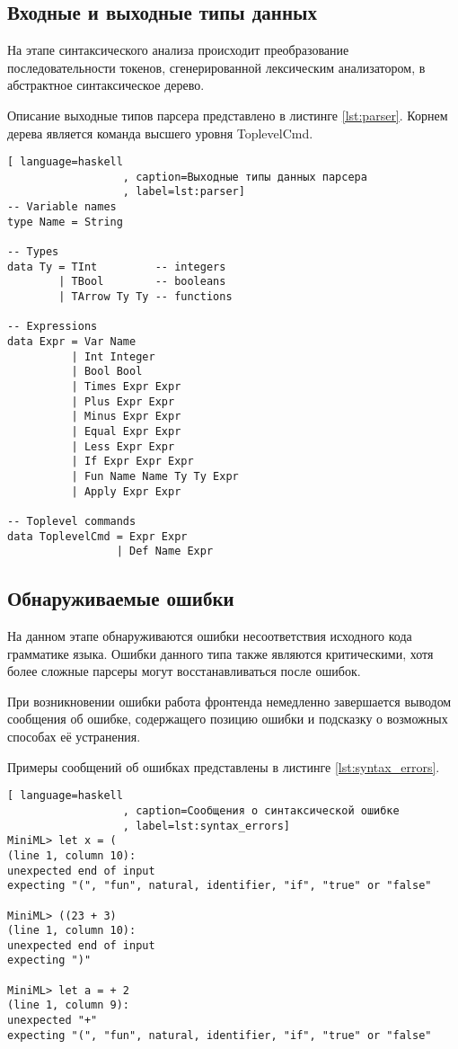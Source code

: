 \documentclass[a4paper,12pt]{article}
\numberwithin{equation}{section}
\begin{document}
\subsection{Входные и выходные типы данных}
На этапе синтаксического анализа происходит преобразование
последовательности токенов, сгенерированной лексическим анализатором,
в абстрактное синтаксическое дерево.


Описание выходные типов парсера представлено в листинге \ref{lst:parser}. 
Корнем дерева является команда высшего уровня ToplevelCmd.

\begin{lstlisting}[ language=haskell
                  , caption=Выходные типы данных парсера
                  , label=lst:parser]
-- Variable names
type Name = String

-- Types
data Ty = TInt         -- integers
        | TBool        -- booleans
        | TArrow Ty Ty -- functions

-- Expressions
data Expr = Var Name
          | Int Integer
          | Bool Bool
          | Times Expr Expr
          | Plus Expr Expr
          | Minus Expr Expr
          | Equal Expr Expr
          | Less Expr Expr
          | If Expr Expr Expr
          | Fun Name Name Ty Ty Expr
          | Apply Expr Expr

-- Toplevel commands
data ToplevelCmd = Expr Expr
                 | Def Name Expr
\end{lstlisting}

\subsection{Обнаруживаемые ошибки}
На данном этапе обнаруживаются ошибки несоответствия исходного кода
грамматике языка. Ошибки данного типа также являются критическими,
хотя более сложные парсеры могут восстанавливаться после ошибок.


При возникновении ошибки работа фронтенда немедленно завершается
выводом сообщения об ошибке, содержащего позицию ошибки и подсказку о
возможных способах её устранения.


Примеры сообщений об ошибках представлены в листинге \ref{lst:syntax_errors}.

\begin{lstlisting}[ language=haskell
                  , caption=Сообщения о синтаксической ошибке
                  , label=lst:syntax_errors]
MiniML> let x = (
(line 1, column 10):
unexpected end of input
expecting "(", "fun", natural, identifier, "if", "true" or "false"

MiniML> ((23 + 3) 
(line 1, column 10):
unexpected end of input
expecting ")"

MiniML> let a = + 2
(line 1, column 9):
unexpected "+"
expecting "(", "fun", natural, identifier, "if", "true" or "false"
\end{lstlisting}
\end{document}
